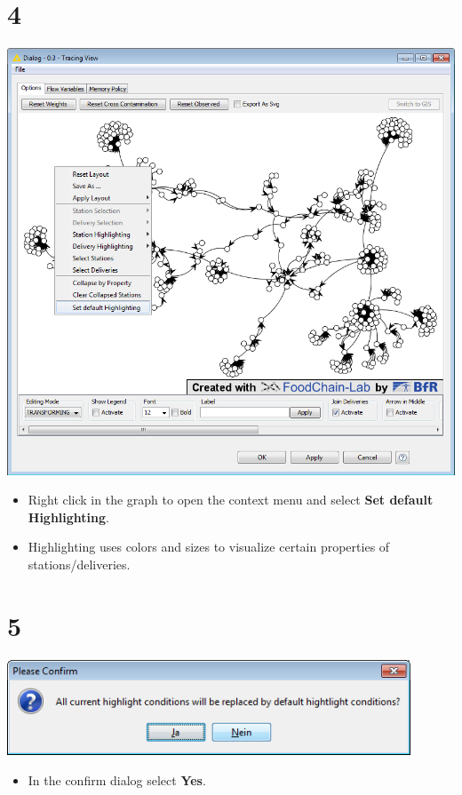 \documentclass{beamer}
\begin{document}
\section{4}
\begin{frame}
	\begin{center}
  		\includegraphics[height=0.6\textheight]{4.png}
	\end{center}
	\begin{itemize}
		\item Right click in the graph to open the context menu and select \textbf{Set default Highlighting}.
		\item Highlighting uses colors and sizes to visualize certain properties of stations/deliveries.
	\end{itemize}
\end{frame}

\section{5}
\begin{frame}
	\begin{center}
  		\includegraphics[width=0.9\textwidth]{5.png}
	\end{center}
	\begin{itemize}
		\item In the confirm dialog select \textbf{Yes}.
	\end{itemize}
\end{frame}
\end{document}
